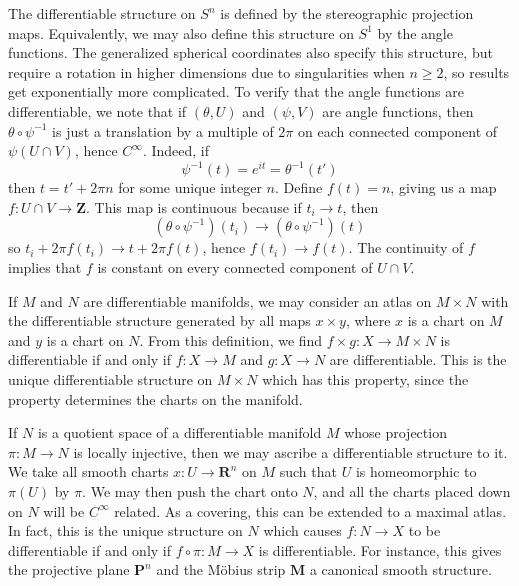 \begin{example}
    The differentiable structure on $S^n$ is defined by the stereographic projection maps. Equivalently, we may also define this structure on $S^1$ by the angle functions. The generalized spherical coordinates also specify this structure, but require a rotation in higher dimensions due to singularities when $n \geq 2$, so results get exponentially more complicated. To verify that the angle functions are differentiable, we note that if $(\theta,U)$ and $(\psi,V)$ are angle functions, then $\theta \circ \psi^{-1}$ is just a translation by a multiple of $2\pi$ on each connected component of $\psi(U \cap V)$, hence $C^\infty$. Indeed, if
    \[ \psi^{-1}(t) = e^{it} = \theta^{-1}(t') \]
    then $t = t' + 2 \pi n$ for some unique integer $n$. Define $f(t) = n$, giving us a map $f: U \cap V \to \mathbf{Z}$. This map is continuous because if $t_i \to t$, then
    \[ (\theta \circ \psi^{-1})(t_i) \to (\theta \circ \psi^{-1})(t) \]
    so $t_i + 2 \pi f(t_i) \to t + 2 \pi f(t)$, hence $f(t_i) \to f(t)$. The continuity of $f$ implies that $f$ is constant on every connected component of $U \cap V$.
\end{example}

\begin{example}
    If $M$ and $N$ are differentiable manifolds, we may consider an atlas on $M \times N$ with the differentiable structure generated by all maps $x \times y$, where $x$ is a chart on $M$ and $y$ is a chart on $N$. From this definition, we find $f \times g: X \to M \times N$ is differentiable if and only if $f: X \to M$ and $g: X \to N$ are differentiable. This is the unique differentiable structure on $M \times N$ which has this property, since the property determines the charts on the manifold.
\end{example}

\begin{example}
    If $N$ is a quotient space of a differentiable manifold $M$ whose projection $\pi:M \to N$ is locally injective, then we may ascribe a differentiable structure to it. We take all smooth charts $x:U \to \mathbf{R}^n$ on $M$ such that $U$ is homeomorphic to $\pi(U)$ by $\pi$. We may then push the chart onto $N$, and all the charts placed down on $N$ will be $C^\infty$ related. As a covering, this can be extended to a maximal atlas. In fact, this is the unique structure on $N$ which causes $f: N \to X$ to be differentiable if and only if $f \circ \pi: M \to X$ is differentiable. For instance, this gives the projective plane $\mathbf{P}^n$ and the M\"{o}bius strip $\mathbf{M}$ a canonical smooth structure.
\end{example}

